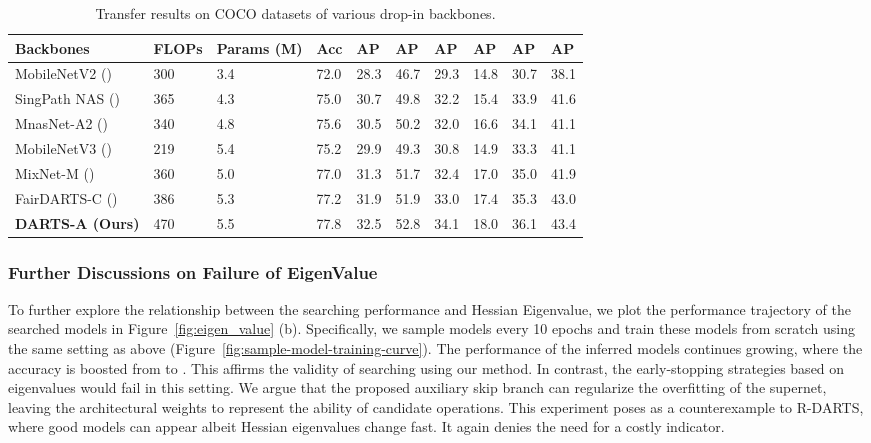 \documentclass{article} \usepackage{iclr2021_conference,times}
\newcommand{\citeyp}[1]{(\citeyear{#1})}
\begin{document}
\begin{table*}[ht]
	\small
	\begin{center}
		\caption{Transfer results on COCO datasets of various drop-in backbones.}
		\label{table:darts-coco-retina}
		\begin{tabular}{*{1}{l}H*{8}{l}}
			\toprule
			\textbf{Backbones} &\textbf{FLOPs}  & \textbf{Params (M)} & \textbf{Acc}  & \textbf{AP} & \textbf{AP} & \textbf{AP} & \textbf{AP} & \textbf{AP} & \textbf{AP} \\
\midrule
			MobileNetV2 \citeyp{sandler2018mobilenetv2} & 300 & 3.4& 72.0 & 28.3 & 46.7 & 29.3 & 14.8 & 30.7 & 38.1\\
			SingPath NAS \citeyp{stamoulis2019single} & 365 & 4.3 & 75.0 & 30.7 & 49.8 & 32.2 & 15.4 &33.9 & 41.6\\
			MnasNet-A2 \citeyp{tan2018mnasnet} & 340& 4.8 & 75.6 & 30.5 & 50.2 & 32.0 & 16.6 & 34.1 & 41.1\\
MobileNetV3 \citeyp{howard2019searching} & 219 & 5.4 & 75.2& 29.9 & 49.3 & 30.8 & 14.9 & 33.3 & 41.1\\
MixNet-M \citeyp{tan2020mixconv} & 360 & 5.0 & 77.0 & 31.3& 51.7 & 32.4& 17.0 & 35.0 & 41.9   \\
			FairDARTS-C \citeyp{chu2019fair} & 386 & 5.3 & 77.2 & 31.9 & 51.9 & 33.0 & 17.4 & 35.3 & 43.0 \\
			\textbf{DARTS-A (Ours)} & 470 & 5.5& 77.8& 32.5& 52.8 & 34.1& 18.0 & 36.1 & 43.4  \\
			
			\bottomrule
\end{tabular}
	\end{center}
	\vskip -0.15in
\end{table*}

\subsubsection{Further Discussions on Failure of EigenValue}\label{sec:failure_eigen}

To further explore the relationship between the searching performance and Hessian Eigenvalue, we plot the performance trajectory of the searched models in Figure~\ref{fig:eigen_value} (b). Specifically, we sample models every 10 epochs and train these models from scratch using the same setting as above (Figure~\ref{fig:sample-model-training-curve}). The performance of the inferred models continues growing, where the accuracy is boosted from  to . This affirms the validity of searching using our method. In contrast, the early-stopping strategies based on eigenvalues \citep{zela2020understanding} would fail in this setting. We argue that the proposed auxiliary skip branch can regularize the overfitting of the supernet, leaving the architectural weights to represent the ability of candidate operations. This experiment poses as a counterexample to R-DARTS, where good models can appear albeit Hessian eigenvalues change fast. It again denies the need for a costly indicator.
\end{document}
